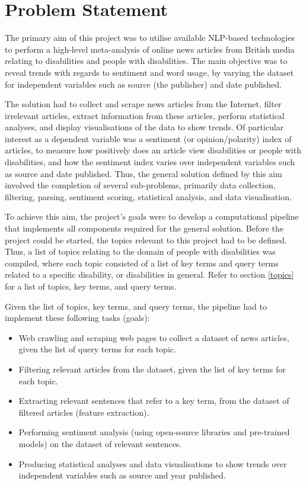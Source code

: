 \documentclass{report}
\begin{document}
\section{Problem Statement} \label{Problem Statement}

The primary aim of this project was to utilise available NLP-based technologies to perform a high-level meta-analysis of online news articles from British media relating to disabilities and people with disabilities. 
The main objective was to reveal trends with regards to sentiment and word usage, by varying the dataset for independent variables such as source (the publisher) and date published.

The solution had to collect and scrape news articles from the Internet, filter irrelevant articles, extract information from these articles, perform statistical analyses, and display visualisations of the data to show trends.
Of particular interest as a dependent variable was a sentiment (or opinion/polarity) index of articles, to measure how positively does an article view disabilities or people with disabilities, and how the sentiment index varies over independent variables such as source and date published.
Thus, the general solution defined by this aim involved the completion of several sub-problems, primarily data collection, filtering, parsing, sentiment scoring, statistical analysis, and data visualisation.

To achieve this aim, the project's goals were to develop a computational pipeline that implements all components required for the general solution.
Before the project could be started, the topics relevant to this project had to be defined.
Thus, a list of topics relating to the domain of people with disabilities was compiled, where each topic consisted of a list of key terms and query terms related to a specific disability, or disabilities in general.
Refer to section \ref{topics} for a list of topics, key terms, and query terms.

Given the list of topics, key terms, and query terms, the pipeline had to implement these following tasks (goals):
\begin{itemize}
	\item Web crawling and scraping web pages to collect a dataset of news articles, given the list of query terms for each topic.
	\item Filtering relevant articles from the dataset, given the list of key terms for each topic.
	\item Extracting relevant sentences that refer to a key term, from the dataset of filtered articles (feature extraction).
	\item Performing sentiment analysis (using open-source libraries and pre-trained models) on the dataset of relevant sentences.
	\item Producing statistical analyses and data visualisations to show trends over independent variables such as source and year published.
\end{itemize}
\end{document}
